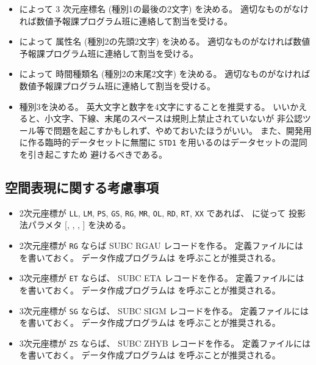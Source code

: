 \begin{itemize}
\begin{itemize}
    \end{itemize}
\item
	 によって
	3 次元座標名 (種別1の最後の2文字) を決める。
	適切なものがなければ数値予報課プログラム班に連絡して割当を受ける。
\item
	 によって
	属性名 (種別2の先頭2文字) を決める。
	適切なものがなければ数値予報課プログラム班に連絡して割当を受ける。
\item
	 によって
	時間種類名 (種別2の末尾2文字) を決める。
	適切なものがなければ数値予報課プログラム班に連絡して割当を受ける。
\item
	種別3を決める。
	英大文字と数字を4文字にすることを推奨する。
	いいかえると、小文字、下線、末尾のスペースは規則上禁止されていないが
	非公認ツール等で問題を起こすかもしれず、やめておいたほうがいい。
	また、開発用に作る臨時的データセットに無闇に
	{\tt STD1} を用いるのはデータセットの混同を引き起こすため
	避けるべきである。
\end{itemize}

\subsection{空間表現に関する考慮事項}

\begin{itemize}
\item
	2次元座標が {\tt LL}, {\tt LM}, {\tt PS}, {\tt GS}, {\tt RG},
	{\tt MR}, {\tt OL}, {\tt RD}, {\tt RT}, {\tt XX}
	であれば、 に従って
	投影法パラメタ
	[, ,
	, ] を決める。
\item
	2次元座標が {\tt RG} ならば
	SUBC RGAU レコードを作る。
	定義ファイルには  を書いておく。
	データ作成プログラムは
	を呼ぶことが推奨される。
\item
	3次元座標が {\tt ET} ならば、
	SUBC ETA レコードを作る。
	定義ファイルには  を書いておく。
	データ作成プログラムは
	を呼ぶことが推奨される。
\item
	3次元座標が {\tt SG} ならば、
	SUBC SIGM レコードを作る。
	定義ファイルには  を書いておく。
	データ作成プログラムは
	を呼ぶことが推奨される。
\item
	3次元座標が {\tt ZS} ならば、
	SUBC ZHYB レコードを作る。
	定義ファイルには  を書いておく。
	データ作成プログラムは
	を呼ぶことが推奨される。
\end{itemize}


